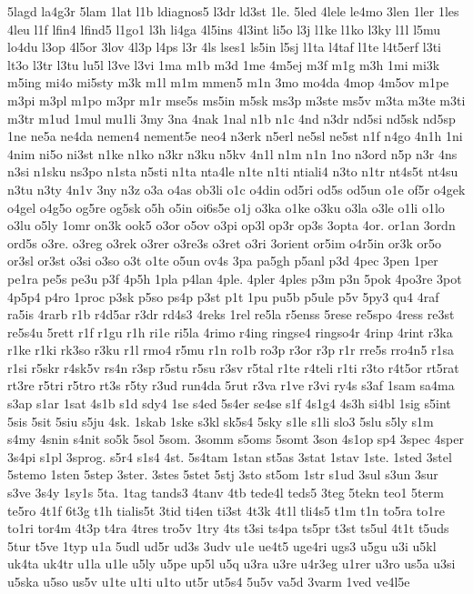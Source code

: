 {5lagd
la4g3r
5lam
1lat
l1b
ldiagnos5
l3dr
ld3st
1le.
5led
4lele
le4mo
3len
1ler
1les
4leu
l1f
lfin4
lfind5
l1go1
l3h
li4ga
4l5ins
4l3int
li5o
l3j
l1ke
l1ko
l3ky
l1l
l5mu
lo4du
l3op
4l5or
3lov
4l3p
l4ps
l3r
4ls
lses1
ls5in
l5sj
l1ta
l4taf
l1te
l4t5erf
l3ti
lt3o
l3tr
l3tu
lu5l
l3ve
l3vi
1ma
m1b
m3d
1me
4m5ej
m3f
m1g
m3h
1mi
mi3k
m5ing
mi4o
mi5sty
m3k
m1l
m1m
mmen5
m1n
3mo
mo4da
4mop
4m5ov
m1pe
m3pi
m3pl
m1po
m3pr
m1r
mse5s
ms5in
m5sk
ms3p
m3ste
ms5v
m3ta
m3te
m3ti
m3tr
m1ud
1mul
mu1li
3my
3na
4nak
1nal
n1b
n1c
4nd
n3dr
nd5si
nd5sk
nd5sp
1ne
ne5a
ne4da
nemen4
nement5e
neo4
n3erk
n5erl
ne5sl
ne5st
n1f
n4go
4n1h
1ni
4nim
ni5o
ni3st
n1ke
n1ko
n3kr
n3ku
n5kv
4n1l
n1m
n1n
1no
n3ord
n5p
n3r
4ns
n3si
n1sku
ns3po
n1sta
n5sti
n1ta
nta4le
n1te
n1ti
ntiali4
n3to
n1tr
nt4s5t
nt4su
n3tu
n3ty
4n1v
3ny
n3z
o3a
o4as
ob3li
o1c
o4din
od5ri
od5s
od5un
o1e
of5r
o4gek
o4gel
o4g5o
og5re
og5sk
o5h
o5in
oi6s5e
o1j
o3ka
o1ke
o3ku
o3la
o3le
o1li
o1lo
o3lu
o5ly
1omr
on3k
ook5
o3or
o5ov
o3pi
op3l
op3r
op3s
3opta
4or.
or1an
3ordn
ord5s
o3re.
o3reg
o3rek
o3rer
o3re3s
o3ret
o3ri
3orient
or5im
o4r5in
or3k
or5o
or3sl
or3st
o3si
o3so
o3t
o1te
o5un
ov4s
3pa
pa5gh
p5anl
p3d
4pec
3pen
1per
pe1ra
pe5s
pe3u
p3f
4p5h
1pla
p4lan
4ple.
4pler
4ples
p3m
p3n
5pok
4po3re
3pot
4p5p4
p4ro
1proc
p3sk
p5so
ps4p
p3st
p1t
1pu
pu5b
p5ule
p5v
5py3
qu4
4raf
ra5is
4rarb
r1b
r4d5ar
r3dr
rd4s3
4reks
1rel
re5la
r5enss
5rese
re5spo
4ress
re3st
re5s4u
5rett
r1f
r1gu
r1h
ri1e
ri5la
4rimo
r4ing
ringse4
ringso4r
4rinp
4rint
r3ka
r1ke
r1ki
rk3so
r3ku
r1l
rmo4
r5mu
r1n
ro1b
ro3p
r3or
r3p
r1r
rre5s
rro4n5
r1sa
r1si
r5skr
r4sk5v
rs4n
r3sp
r5stu
r5su
r3sv
r5tal
r1te
r4teli
r1ti
r3to
r4t5or
rt5rat
rt3re
r5tri
r5tro
rt3s
r5ty
r3ud
run4da
5rut
r3va
r1ve
r3vi
ry4s
s3af
1sam
sa4ma
s3ap
s1ar
1sat
4s1b
s1d
sdy4
1se
s4ed
5s4er
se4se
s1f
4s1g4
4s3h
si4bl
1sig
s5int
5sis
5sit
5siu
s5ju
4sk.
1skab
1ske
s3kl
sk5s4
5sky
s1le
s1li
slo3
5slu
s5ly
s1m
s4my
4snin
s4nit
so5k
5sol
5som.
3somm
s5oms
5somt
3son
4s1op
sp4
3spec
4sper
3s4pi
s1pl
3sprog.
s5r4
s1s4
4st.
5s4tam
1stan
st5as
3stat
1stav
1ste.
1sted
3stel
5stemo
1sten
5step
3ster.
3stes
5stet
5stj
3sto
st5om
1str
s1ud
3sul
s3un
3sur
s3ve
3s4y
1sy1s
5ta.
1tag
tands3
4tanv
4tb
tede4l
teds5
3teg
5tekn
teo1
5term
te5ro
4t1f
6t3g
t1h
tialis5t
3tid
ti4en
ti3st
4t3k
4t1l
tli4s5
t1m
t1n
to5ra
to1re
to1ri
tor4m
4t3p
t4ra
4tres
tro5v
1try
4ts
t3si
ts4pa
ts5pr
t3st
ts5ul
4t1t
t5uds
5tur
t5ve
1typ
u1a
5udl
ud5r
ud3s
3udv
u1e
ue4t5
uge4ri
ugs3
u5gu
u3i
u5kl
uk4ta
uk4tr
u1la
u1le
u5ly
u5pe
up5l
u5q
u3ra
u3re
u4r3eg
u1rer
u3ro
us5a
u3si
u5ska
u5so
us5v
u1te
u1ti
u1to
ut5r
ut5s4
5u5v
va5d
3varm
1ved
ve4l5e
}
